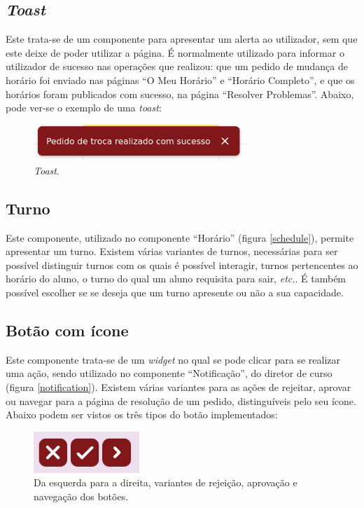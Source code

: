 \documentclass[12pt, a4paper]{article}
\begin{document}
\subsection{\emph{Toast}}

Este trata-se de um componente para apresentar um alerta ao utilizador, sem que este deixe de poder
utilizar a página. É normalmente utilizado para informar o utilizador de sucesso nas operações que
realizou: que um pedido de mudança de horário foi enviado nas páginas ``O Meu Horário'' e
``Horário Completo'', e que os horários foram publicados com sucesso, na página
``Resolver Problemas''. Abaixo, pode ver-se o exemplo de uma \emph{toast}:

\begin{figure}[H]
    \centering
    \includegraphics[width=8cm]{res/components/toast.png}
    \caption{\emph{Toast}.}
    \label{toast}
\end{figure}

\subsection{Turno}

Este componente, utilizado no componente ``Horário'' (figura \ref{schedule}), permite apresentar um
turno. Existem várias variantes de turnos, necessárias para ser possível distinguir turnos com os
quais é possível interagir, turnos pertencentes ao horário do aluno, o turno do qual um aluno
requisita para sair, \emph{etc.}. É também possível escolher se se deseja que um turno apresente ou
não a sua capacidade.

\subsection{Botão com ícone}

Este componente trata-se de um \emph{widget} no qual se pode clicar para se realizar uma ação,
sendo utilizado no componente ``Notificação'', do diretor de curso (figura \ref{notification}).
Existem várias variantes para as ações de rejeitar, aprovar ou navegar para a página de resolução
de um pedido, distinguíveis pelo seu ícone. Abaixo podem ser vistos os três tipos do botão
implementados:

\begin{figure}[H]
    \centering
    \includegraphics[width=4cm]{res/components/icon-button.png}
    \caption{Da esquerda para a direita, variantes de rejeição, aprovação e navegação dos botões.}
    \label{icon-button}
\end{figure}
\end{document}
